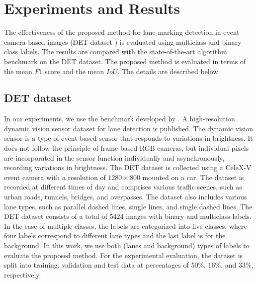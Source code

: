 \documentclass[journal]{IEEEtran}
\begin{document}
\section{Experiments and Results}
The effectiveness of the proposed method for lane marking detection in event camera-based images (DET dataset \cite{Cheng2019}) is evaluated using multiclass and binary-class labels. The results are compared with the state-of-the-art algorithm benchmark on the DET dataset. The proposed method is evaluated in terms of the mean $F1$ score and the mean $IoU$. The details are described below.
\subsection{DET dataset}
In our experiments, we use the benchmark developed by \cite{Cheng2019}.
A high-resolution dynamic vision sensor dataset for lane detection is published. The dynamic vision sensor is a type of event-based sensor that responds to variations in brightness. It does not follow the principle of frame-based RGB cameras, 
but individual pixels are incorporated in the sensor function individually and asynchronously, recording variations in brightness. The DET dataset is collected using a CeleX-V event camera with a resolution of $1280 \times 800$ mounted on a car. The dataset is recorded at different times of day and comprises various traffic scenes, such as urban roads, tunnels, bridges, and overpasses. The dataset also includes various lane types, such as parallel dashed lines, single lines, and single dashed lines.
The DET dataset consists of a total of $5424$ images with binary and multiclass labels. In the case of multiple classes, the labels are categorized into five classes, where four labels correspond to different lane types and the last label is for the background. In this work, we use both (lanes and background) types of labels to evaluate the proposed method. For the experimental evaluation, the dataset is split into training, validation and test data at percentages of 50\%, 16\%, and 33\%, respectively.
\end{document}
